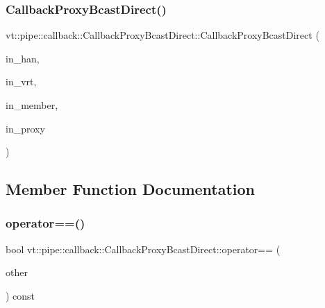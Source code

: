 \subsubsection{\texorpdfstring{Callback\+Proxy\+Bcast\+Direct()}{CallbackProxyBcastDirect()}\hspace{0.1cm}{\footnotesize\ttfamily [2/2]}}
{\footnotesize\ttfamily vt\+::pipe\+::callback\+::\+Callback\+Proxy\+Bcast\+Direct\+::\+Callback\+Proxy\+Bcast\+Direct (\begin{DoxyParamCaption}\item[{\hyperlink{namespacevt_af64846b57dfcaf104da3ef6967917573}{Handler\+Type} const \&}]{in\+\_\+han,  }\item[{\hyperlink{structvt_1_1pipe_1_1callback_1_1_callback_proxy_bcast_direct_a543cd86434430bd048952534f4fbc128}{Auto\+Handler\+Type} const \&}]{in\+\_\+vrt,  }\item[{bool const \&}]{in\+\_\+member,  }\item[{\hyperlink{namespacevt_a1b417dd5d684f045bb58a0ede70045ac}{Virtual\+Proxy\+Type} const \&}]{in\+\_\+proxy }\end{DoxyParamCaption})\hspace{0.3cm}{\ttfamily [inline]}}



\subsection{Member Function Documentation}
\mbox{\label{structvt_1_1pipe_1_1callback_1_1_callback_proxy_bcast_direct_a47efba43a917e20ecdbaa513e502272b}} 
\subsubsection{\texorpdfstring{operator==()}{operator==()}}
{\footnotesize\ttfamily bool vt\+::pipe\+::callback\+::\+Callback\+Proxy\+Bcast\+Direct\+::operator== (\begin{DoxyParamCaption}\item[{\hyperlink{structvt_1_1pipe_1_1callback_1_1_callback_proxy_bcast_direct}{Callback\+Proxy\+Bcast\+Direct} const \&}]{other }\end{DoxyParamCaption}) const\hspace{0.3cm}{\ttfamily [inline]}}

